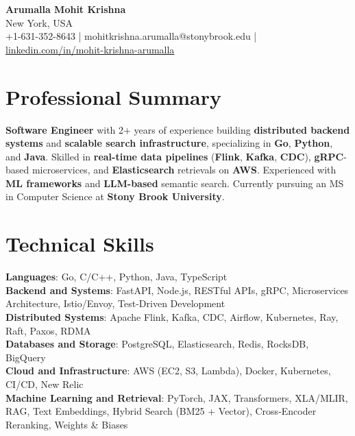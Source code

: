 \documentclass[letterpaper,11pt]{article}
\begin{document}
\begin{center}
  {\Large \textbf{Arumalla Mohit Krishna}} \\
  New York, USA \\
  +1-631-352-8643 \enspace | \enspace mohitkrishna.arumalla@stonybrook.edu \enspace | \enspace \href{https://www.linkedin.com/in/mohit-krishna-arumalla}{linkedin.com/in/mohit-krishna-arumalla}
\end{center}

\section{Professional Summary}
  \begin{itemize}[leftmargin=0.15in, label={}]
    \small{\item{
     \textbf{Software Engineer} with 2+ years of experience building \textbf{distributed backend systems} and \textbf{scalable search infrastructure}, specializing in \textbf{Go}, \textbf{Python}, and \textbf{Java}. Skilled in \textbf{real-time data pipelines} (\textbf{Flink}, \textbf{Kafka}, \textbf{CDC}), \textbf{gRPC}-based microservices, and \textbf{Elasticsearch} retrievals on \textbf{AWS}. Experienced with \textbf{ML frameworks} and \textbf{LLM-based} semantic search. Currently pursuing an MS in Computer Science at \textbf{Stony Brook University}.
    }}
  \end{itemize}
\vspace{-16pt}

\section{Technical Skills}
 \begin{itemize}[leftmargin=0.15in, label={}]
    \small{\item{
     \textbf{Languages}: Go, C/C++, Python, Java, TypeScript \\
     \textbf{Backend and Systems}: FastAPI, Node.js, RESTful APIs, gRPC, Microservices Architecture, Istio/Envoy, Test-Driven Development \\
     \textbf{Distributed Systems}: Apache Flink, Kafka, CDC, Airflow, Kubernetes, Ray, Raft, Paxos, RDMA \\
     \textbf{Databases and Storage}: PostgreSQL, Elasticsearch, Redis, RocksDB, BigQuery \\
     \textbf{Cloud and Infrastructure}: AWS (EC2, S3, Lambda), Docker, Kubernetes, CI/CD, New Relic \\
     \textbf{Machine Learning and Retrieval}: PyTorch, JAX, Transformers, XLA/MLIR, RAG, Text Embeddings, Hybrid Search (BM25 + Vector), Cross-Encoder Reranking, Weights \& Biases
    }}
 \end{itemize}
\vspace{-16pt}
\end{document}
